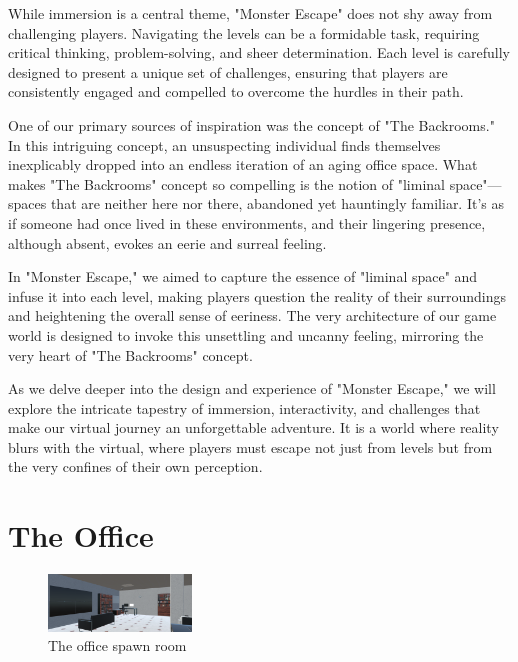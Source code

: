 \documentclass{vgtc}                          %
\begin{document}
While immersion is a central theme, "Monster Escape" does not shy away from challenging players. Navigating the levels can be a formidable task, requiring critical thinking, problem-solving, and sheer determination. Each level is carefully designed to present a unique set of challenges, ensuring that players are consistently engaged and compelled to overcome the hurdles in their path.

One of our primary sources of inspiration was the concept of "The Backrooms." In this intriguing concept, an unsuspecting individual finds themselves inexplicably dropped into an endless iteration of an aging office space. What makes "The Backrooms" concept so compelling is the notion of "liminal space"—spaces that are neither here nor there, abandoned yet hauntingly familiar. It's as if someone had once lived in these environments, and their lingering presence, although absent, evokes an eerie and surreal feeling.

In "Monster Escape," we aimed to capture the essence of "liminal space" and infuse it into each level, making players question the reality of their surroundings and heightening the overall sense of eeriness. The very architecture of our game world is designed to invoke this unsettling and uncanny feeling, mirroring the very heart of "The Backrooms" concept.

As we delve deeper into the design and experience of "Monster Escape," we will explore the intricate tapestry of immersion, interactivity, and challenges that make our virtual journey an unforgettable adventure. It is a world where reality blurs with the virtual, where players must escape not just from levels but from the very confines of their own perception.

\section{The Office}

\begin{figure}[htb]
  \centering
  \includegraphics[width=1.5in]{The Office.png}
  \caption{The office spawn room}
\end{figure}
\end{document}

